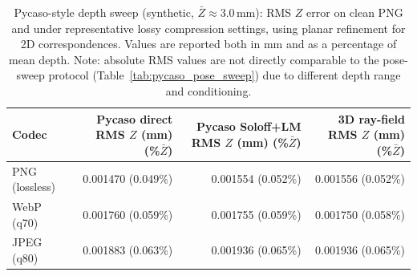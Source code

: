 \begin{table}[H]
\centering
\scriptsize
\setlength{\tabcolsep}{4pt}
\begin{tabular}{lrrr}
\toprule
Codec & \shortstack{Pycaso direct\\RMS $Z$ (mm)\\(\%$\bar Z$)} & \shortstack{Pycaso Soloff+LM\\RMS $Z$ (mm)\\(\%$\bar Z$)} & \shortstack{3D ray-field\\RMS $Z$ (mm)\\(\%$\bar Z$)} \\
\midrule
PNG (lossless) & 0.001470 (0.049\%) & 0.001554 (0.052\%) & 0.001556 (0.052\%) \\
WebP (q70) & 0.001760 (0.059\%) & 0.001755 (0.059\%) & 0.001750 (0.058\%) \\
JPEG (q80) & 0.001883 (0.063\%) & 0.001936 (0.065\%) & 0.001936 (0.065\%) \\
\bottomrule
\end{tabular}
\caption{Pycaso-style depth sweep (synthetic, $\bar Z\approx 3.0$\,mm): RMS $Z$ error on clean PNG and under representative lossy compression settings, using planar refinement for 2D correspondences. Values are reported both in mm and as a percentage of mean depth. Note: absolute RMS values are not directly comparable to the pose-sweep protocol (Table~\ref{tab:pycaso_pose_sweep}) due to different depth range and conditioning.}
\label{tab:pycaso_compression}
\end{table}

